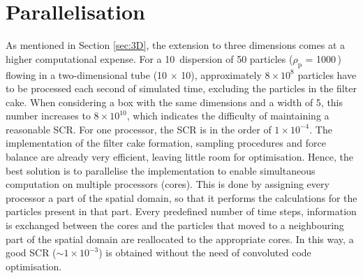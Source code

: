\section{Parallelisation \label{sec:Parallel}}
As mentioned in Section \ref{sec:3D}, the extension to three dimensions comes at a higher computational expense. For a \unit{10}{\kilogram\,\rpcubic\metre} dispersion of \unit{50}{\micro\metre} particles ($\rho_\mathrm{p}$  = \unit{1000}{\kilogram\,\rpcubic\metre}) flowing in a two-dimensional tube (\unit{10}{\centi\metre} $\times$ \unit{10}{\milli\metre}), approximately $8 \times 10^{8}$ particles have to be processed each second of simulated time, excluding the particles in the filter cake. When considering a box with the same dimensions and a width of \unit{5}{\milli\metre}, this number increases to $8 \times 10^{10}$, which indicates the difficulty of maintaining a reasonable \gls{SCR}. For one processor, the \gls{SCR} is in the order of  $1 \times 10^{-4}$. The implementation of the filter cake formation, sampling procedures and force balance are already very efficient, leaving little room for optimisation. Hence, the best solution is to parallelise the implementation to enable simultaneous computation on multiple processors (cores). This is done by assigning every processor a part of the spatial domain, so that it performs the calculations for the particles present in that part. Every predefined number of time steps, information is exchanged between the cores and the particles that moved to a neighbouring part of the spatial domain are reallocated to the appropriate cores. In this way, a good \gls{SCR} ($\sim 1 \times 10^{-3}$) is obtained without the need of convoluted code optimisation.   %

